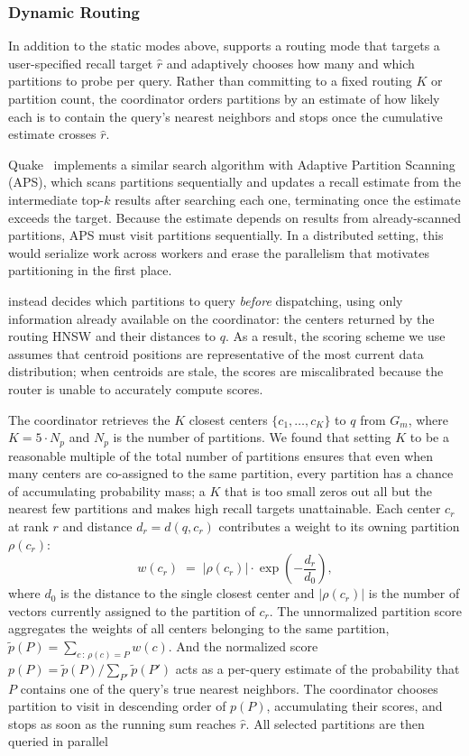 \documentclass[sigconf,review,anonymous]{acmart}
\begin{document}
\subsubsection{Dynamic Routing}
    \label{sec:dynamic-routing}
    In addition to the static modes above, \SystemName{} supports a routing mode that targets a user-specified recall target $\hat{r}$ and adaptively chooses how many and which partitions to probe per query. Rather than committing to a fixed routing $K$ or partition count, the coordinator orders partitions by an estimate of how likely each is to contain the query's nearest neighbors and stops once the cumulative estimate crosses $\hat{r}$.

    Quake~\cite{mohoney2025quake} implements a similar search algorithm with Adaptive Partition Scanning (APS), which scans partitions sequentially and updates a recall estimate from the intermediate top-$k$ results after searching each one, terminating once the estimate exceeds the target. Because the estimate depends on results from already-scanned partitions, APS must visit partitions sequentially. In a distributed setting, this would serialize work across workers and erase the parallelism that motivates partitioning in the first place.

    \SystemName{} instead decides which partitions to query \emph{before} dispatching, using only information already available on the coordinator: the centers returned by the routing HNSW and their distances to $q$. As a result, the scoring scheme we use assumes that centroid positions are representative of the most current data distribution; when centroids are stale, the scores are miscalibrated because the router is unable to accurately compute scores.
    
    The coordinator retrieves the $K$ closest centers $\{c_1, \ldots, c_K\}$ to $q$ from $G_m$, where $K = 5 \cdot N_p$ and $N_p$ is the number of partitions. We found that setting $K$ to be a reasonable multiple of the total number of partitions ensures that even when many centers are co-assigned to the same partition, every partition has a chance of accumulating probability mass; a $K$ that is too small zeros out all but the nearest few partitions and makes high recall targets unattainable. Each center $c_r$ at rank $r$ and distance $d_r = d(q, c_r)$ contributes a weight to its owning partition $\rho(c_r)$:
    \[
    w(c_r) \;=\; \lvert\rho(c_r)\rvert \cdot \exp\!\left(-\frac{d_r}{d_0}\right),
    \]
    where $d_0$ is the distance to the single closest center and $\lvert\rho(c_r)\rvert$ is the number of vectors currently assigned to the partition of $c_r$. The unnormalized partition score aggregates the weights of all centers belonging to the same partition, $\tilde{p}(P) = \sum_{c \,:\, \rho(c) = P} w(c)$. And the normalized score $p(P) = \tilde{p}(P) / \sum_{P'} \tilde{p}(P')$ acts as a per-query estimate of the probability that $P$ contains one of the query's true nearest neighbors. The coordinator chooses partition to visit in descending order of $p(P)$, accumulating their scores, and stops as soon as the running sum reaches $\hat{r}$. All selected partitions are then queried in parallel
\end{document}
